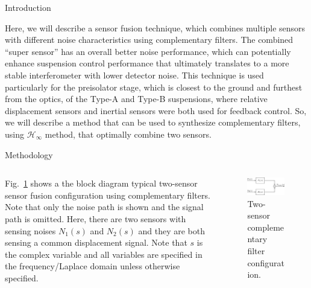 \documentclass{beamer}
\begin{document}
\begin{frame}[t]
\begin{columns}[t]
\begin{column}{0.32\linewidth}
\begin{block}{Introduction}
				\medskip
				
				Here, we will describe a sensor fusion technique, which combines multiple sensors with different noise characteristics using complementary filters.
				The combined ``super sensor'' has an overall better noise performance, which can potentially enhance suspension control performance that ultimately translates to a more stable interferometer with lower detector noise.
				This technique is used particularly for the preisolator stage, which is closest to the ground and furthest from the optics, of the Type-A and Type-B suspensions, where relative displacement sensors and inertial sensors were both used for feedback control.
				So, we will describe a method that can be used to synthesize complementary filters, using $\mathcal{H}_\infty$ method, that optimally combine two sensors.
			\end{block}
				
			\begin{block}{Methodology}
				\begin{columns}[t, onlytextwidth]
					\begin{column}{0.5\textwidth}
						Fig.~\ref{fig:two-sensor} shows a the block diagram typical two-sensor sensor fusion configuration using complementary filters.
						Note that only the noise path is shown and the signal path is omitted.
						Here, there are two sensors with sensing noises $N_1(s)$ and $N_2(s)$ and they are both sensing a common displacement signal.
						Note that $s$ is the complex variable and all variables are specified in the frequency/Laplace domain unless otherwise specified.
					\end{column}
					\begin{column}{0.5\textwidth}
						\begin{figure}
							\centering
							\includegraphics[width=1\linewidth]{complementary_filter}
							\caption{Two-sensor complementary filter configuration.}
							\label{fig:two-sensor}
						\end{figure}
					\end{column}
				\end{columns}
			\end{block}
		\end{column}
	

\end{columns}
\end{frame}
\end{document}
